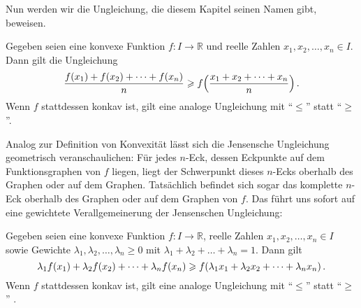 Nun werden wir die Ungleichung, die diesem Kapitel seinen Namen gibt, beweisen.
\begin{satzmitnamen}
	Gegeben seien eine konvexe Funktion $f\colon I\rightarrow \mathbb R$ und reelle Zahlen $x_1,x_2,\dotsc,x_n\in I$. Dann gilt die Ungleichung
	\begin{equation*}
		\frac{f(x_1)+f(x_2)+\dotsb+f(x_n)}{n}\geqslant f\parens*{\frac{x_1+x_2+\dotsb+x_n}{n}}\,.
	\end{equation*}
	Wenn $f$ stattdessen konkav ist, gilt eine analoge Ungleichung mit \enquote{$\leqslant$} statt \enquote{$\geqslant$}.
\end{satzmitnamen}
Analog zur Definition von Konvexität lässt sich die Jensensche Ungleichung geometrisch veranschaulichen: Für jedes $n$-Eck, dessen Eckpunkte auf dem Funktionsgraphen von $f$ liegen, liegt der Schwerpunkt dieses $n$-Ecks oberhalb des Graphen oder auf dem Graphen. Tatsächlich befindet sich sogar das komplette $n$-Eck oberhalb des Graphen oder auf dem Graphen von $f$. Das führt uns sofort auf eine gewichtete Verallgemeinerung der Jensenschen Ungleichung:
\begin{satzmitnamen}
	Gegeben seien eine konvexe Funktion $f\colon I\rightarrow \mathbb R$, reelle Zahlen $x_1,x_2,\dotsc,x_n\in I$ sowie Gewichte $\lambda_1,\lambda_2,\dotsc,\lambda_n\geqslant 0$ mit $\lambda_1+\lambda_2+\dotsc+\lambda_n=1$. Dann gilt
	\begin{equation*}
		\lambda_1f(x_1)+\lambda_2f(x_2)+\dotsb+\lambda_nf(x_n)\geqslant f\parens*{\lambda_1x_1+\lambda_2 x_2+\dotsb+\lambda_nx_n}\,.
	\end{equation*}
	Wenn $f$ stattdessen konkav ist, gilt eine analoge Ungleichung mit \enquote{$\leqslant$} statt \enquote{$\geqslant$} .
\end{satzmitnamen}
